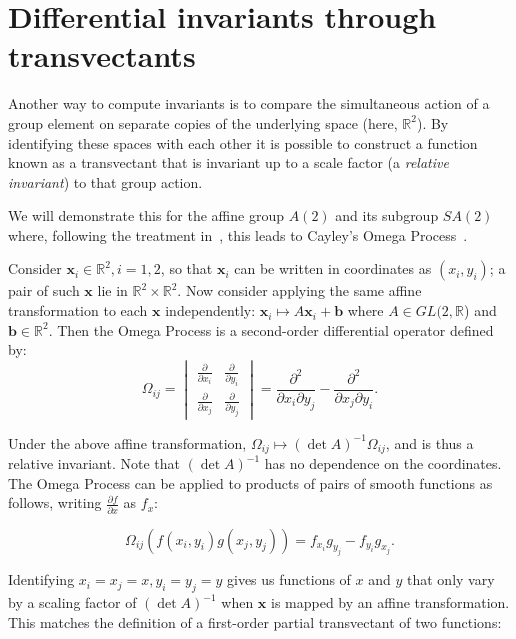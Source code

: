 \documentclass[review,onefignum,onetabnum]{siamonline190516}
\begin{document}
\section{Differential invariants through transvectants}

Another way to compute invariants is to compare the simultaneous action of a group element on separate copies of the underlying space (here, $\mathbb{R}^2$). By identifying these spaces with each other it is possible to construct a function known as a transvectant that is invariant up to a scale factor (a \emph{relative invariant}) to that group action.

We will demonstrate this for the affine group $A(2)$ and its subgroup
$SA(2)$ where, following the treatment in~\cite{OlverCIT}, this leads to
Cayley's Omega Process~\cite{Cayley1846}. 

Consider $\mathbf{x}_i \in \mathbb{R}^2, i=1,2$, so that $\mathbf{x}_i$ can
be written in coordinates as $(x_i, y_i)$; a pair of such $\mathbf{x}$ lie in $\mathbb{R}^2 \times \mathbb{R}^2$. Now consider applying the same affine transformation to each $\mathbf{x}$ independently: $\mathbf{x}_i \mapsto A \mathbf{x}_i + \mathbf{b}$ where $A \in GL(2,\mathbb{R}$) and $\mathbf{b} \in \mathbb{R}^2$. Then the Omega Process is a second-order differential operator defined by: 
\begin{equation}
\Omega_{ij} = \begin{vmatrix} \frac{\partial}{\partial x_i} &
\frac{\partial}{\partial y_i} \\ \frac{\partial}{\partial x_j} &
\frac{\partial}{\partial y_j} \end{vmatrix} = 
\frac{\partial^2}{\partial x_i
\partial y_j} - \frac{\partial^2}{\partial x_j \partial y_i}.
\end{equation}

Under the above affine transformation, $\Omega_{ij} \mapsto (\det A)^{-1}
\Omega_{ij}$, and is thus a relative invariant. Note that $(\det A)^{-1}$ has no dependence on the coordinates.
The Omega Process can be applied to products of pairs of smooth functions as follows,
writing $\frac{\partial f}{\partial x}$ as $f_x$:

\begin{equation}
\Omega_{ij} \left(f(x_i, y_i) g(x_j, y_j)\right) = f_{x_i}g_{y_j} - f_{y_i}g_{x_j}.
\end{equation}

Identifying $x_i = x_j = x, y_i = y_j = y$ gives us functions of $x$ and $y$
that only vary by a scaling factor of $(\det A)^{-1}$ when $\mathbf{x}$ is
mapped by an affine transformation. This matches the definition of a
first-order partial transvectant of two functions:
\end{document}
